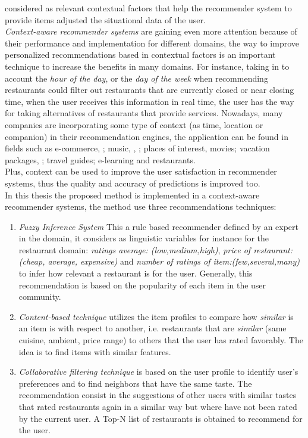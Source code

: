considered as relevant contextual factors that help the recommender
system to provide items adjusted the situational data of the user.\\
\textit{Context-aware recommender systems} are gaining even more
attention because of their performance and implementation for
different domains, the  way to improve personalized recommendations
based in contextual factors is an important technique to increase the
benefits in  many domains. For instance, taking in to account the
\textit{hour of the day},  or the \textit{day of the week} when
recommending restaurants could  filter out restaurants that are
currently closed or near closing time, when the user receives this
information in real time, the user has the  way for taking
alternatives of restaurants that provide services. Nowadays, many
companies are incorporating some type of context (as time, location or
companion) in their recommendation engines,  the application can be
found in fields such as e-commerce\cite{schafer1999recommender},
\cite{bulander2005enabling}; music\cite{ricci2012context}, 
\cite{baltrunas2011incarmusic}, \cite{huq2010automated}; 
places of interest\cite{baltrunas2012context},
movies\cite{eyjolfsdottir2010moviegen}; vacation
packages\cite{liu2011personalized}, \cite{liu2014cocktail}; 
travel guides\cite{savage2012m}; e-learning\cite{ortigosa2010entornos} 
and restaurants\cite{chu2013chinese}.\\
Plus, context can be used to improve the user satisfaction  in
recommender systems, thus the quality and accuracy of predictions  
is improved too.\\
In this thesis the proposed method is implemented in a context-aware 
recommender systems, the method use three recommendations techniques:
\begin{enumerate} 
\item \textit{Fuzzy Inference System} This a rule based recommender
defined by an expert in the domain, it considers as linguistic
variables for instance for the restaurant domain: \textit{ratings
average: (low,medium,high)}, \textit{price of restaurant:(cheap,
average, expensive)} and \textit{number of ratings of
item:(few,several,many)} to infer how relevant a restaurant is for the
user. Generally, this recommendation is based on the popularity of
each item in the user community.
\item \textit{Content-based technique} utilizes the item profiles 
to compare how \textit{similar} is an item is with respect to 
another, i.e. restaurants that are \textit{similar} (same cuisine, 
ambient, price range)  to others that the user has rated favorably. 
The idea is to find items with similar features. 
\item \textit{Collaborative filtering technique} is based on the user
profile to identify user's preferences and to find neighbors that
have the same taste. The recommendation consist in the suggestions of
other users with similar tastes that rated restaurants again in a
similar way but where have not been rated by the current user. A Top-N
list of restaurants is obtained to recommend for the user.
\end{enumerate} 
